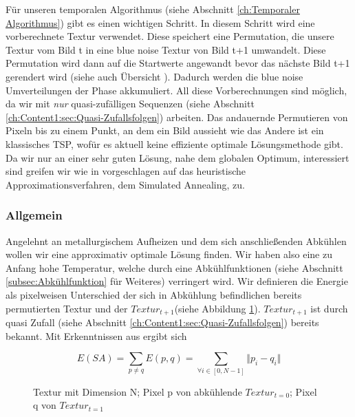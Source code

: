 Für unseren temporalen Algorithmus (siehe Abschnitt \ref{ch:Temporaler Algorithmus}) gibt es einen wichtigen  Schritt.
In diesem Schritt wird eine vorberechnete Textur verwendet. Diese speichert eine Permutation, die unsere  Textur vom Bild t in eine
blue noise Textur von Bild t+1 umwandelt. Diese Permutation wird dann auf die Startwerte angewandt bevor das nächste Bild t+1 gerendert wird 
(siehe auch Übersicht ). Dadurch werden die blue noise Umverteilungen der  Phase akkumuliert. 
All diese Vorberechnungen sind möglich, da wir mit \textit{\glqq nur\grqq} quasi-zufälligen Sequenzen (siehe Abschnitt \ref{ch:Content1:sec:Quasi-Zufallsfolgen}) arbeiten.
Das andauernde Permutieren von Pixeln bis zu einem Punkt, an dem ein Bild aussieht wie das Andere ist ein klassisches TSP, wofür es aktuell keine effiziente optimale Lösungsmethode gibt.
Da wir nur an einer sehr guten Lösung, nahe dem globalen Optimum, interessiert sind greifen wir wie in \cite{hal02158423} vorgeschlagen auf das heuristische Approximationsverfahren,
dem Simulated Annealing, zu.

\subsubsection{Allgemein}

Angelehnt an metallurgischem Aufheizen und dem sich anschließenden Abkühlen wollen wir eine approximativ optimale Lösung finden. Wir haben also eine zu Anfang hohe Temperatur, welche 
durch eine Abkühlfunktionen (siehe Abschnitt \ref{subsec:Abkühlfunktion} für Weiteres) verringert wird. Wir definieren die Energie als pixelweisen Unterschied der sich in Abkühlung 
befindlichen bereits permutierten Textur und der $Textur_{t+1}$(siehe Abbildung \ref{eq:pixel energy function}). $Textur_{t+1}$ ist durch quasi Zufall (siehe Abschnitt
\ref{ch:Content1:sec:Quasi-Zufallsfolgen}) bereits bekannt. Mit Erkenntnissen aus\cite{georgiev2016blue} ergibt sich

\begin{figure}[H]
    \begin{tcolorbox}[rightrule=3mm, rounded corners=east]
    \[ E(SA) = \sum_{p \neq q}E(p,q) = \sum_{\forall i \in [0,N-1]} \Vert{p_{i}-q_{i}}\Vert \]
    \end{tcolorbox}
    \caption{ Textur mit Dimension N; Pixel p von abkühlende 
    $Textur_{t=0}$; Pixel q von $Textur_{t=1}$}
    \label{eq:pixel energy function}
\end{figure}

